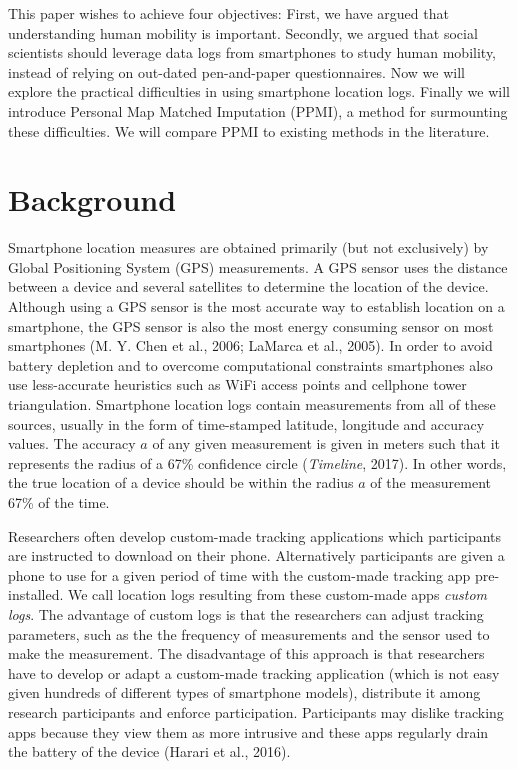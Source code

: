 \documentclass[man]{apa6}
\theoremstyle{definition}
\theoremstyle{definition}
\theoremstyle{definition}
\theoremstyle{remark}
\begin{document}
This paper wishes to achieve four objectives: First, we have argued that
understanding human mobility is important. Secondly, we argued that
social scientists should leverage data logs from smartphones to study
human mobility, instead of relying on out-dated pen-and-paper
questionnaires. Now we will explore the practical difficulties in using
smartphone location logs. Finally we will introduce Personal Map Matched
Imputation (PPMI), a method for surmounting these difficulties. We will
compare PPMI to existing methods in the literature.

\section{Background}\label{background}

Smartphone location measures are obtained primarily (but not
exclusively) by Global Positioning System (GPS) measurements. A GPS
sensor uses the distance between a device and several satellites to
determine the location of the device. Although using a GPS sensor is the
most accurate way to establish location on a smartphone, the GPS sensor
is also the most energy consuming sensor on most smartphones (M. Y. Chen
et al., 2006; LaMarca et al., 2005). In order to avoid battery depletion
and to overcome computational constraints smartphones also use
less-accurate heuristics such as WiFi access points and cellphone tower
triangulation. Smartphone location logs contain measurements from all of
these sources, usually in the form of time-stamped latitude, longitude
and accuracy values. The accuracy \(a\) of any given measurement is
given in meters such that it represents the radius of a 67\% confidence
circle (\emph{Timeline}, 2017). In other words, the true location of a
device should be within the radius \(a\) of the measurement 67\% of the
time.

Researchers often develop custom-made tracking applications which
participants are instructed to download on their phone. Alternatively
participants are given a phone to use for a given period of time with
the custom-made tracking app pre-installed. We call location logs
resulting from these custom-made apps \emph{custom logs}. The advantage
of custom logs is that the researchers can adjust tracking parameters,
such as the the frequency of measurements and the sensor used to make
the measurement. The disadvantage of this approach is that researchers
have to develop or adapt a custom-made tracking application (which is
not easy given hundreds of different types of smartphone models),
distribute it among research participants and enforce participation.
Participants may dislike tracking apps because they view them as more
intrusive and these apps regularly drain the battery of the device
(Harari et al., 2016).
\end{document}
